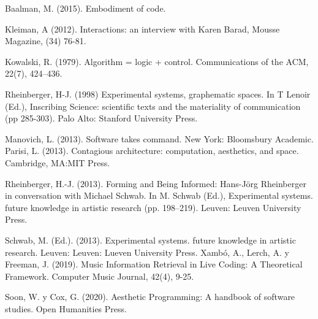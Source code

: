 Baalman, M. (2015). Embodiment of code.

Kleiman, A (2012). Interactions: an interview with Karen Barad, Mousse Magazine, (34) 76-81.

Kowalski, R. (1979). Algorithm = logic + control. Communications of the ACM, 22(7), 424–436.

Rheinberger, H-J. (1998) Experimental systems, graphematic spaces. In T Lenoir (Ed.), Inscribing Science: scientific texts and the materiality of communication (pp 285-303). Palo Alto: Stanford University Press.

Manovich, L. (2013). Software takes command. New York: Bloomsbury Academic.
Parisi, L. (2013). Contagious architecture: computation, aesthetics, and space. Cambridge, MA:MIT Press.

Rheinberger, H.-J. (2013). Forming and Being Informed: Hans-Jörg Rheinberger in conversation with Michael Schwab. In M. Schwab (Ed.), Experimental systems. future knowledge in artistic research (pp. 198–219). Leuven: Leuven University Press.

Schwab, M. (Ed.). (2013). Experimental systems. future knowledge in artistic research. Leuven: Leuven: Lueven University Press.
Xambó, A., Lerch, A. y Freeman, J. (2019). Music Information Retrieval in Live Coding: A Theoretical Framework. Computer Music Journal, 42(4), 9-25.

Soon, W. y Cox, G. (2020). Aesthetic Programming: A handbook of software studies. Open Humanities Press.

